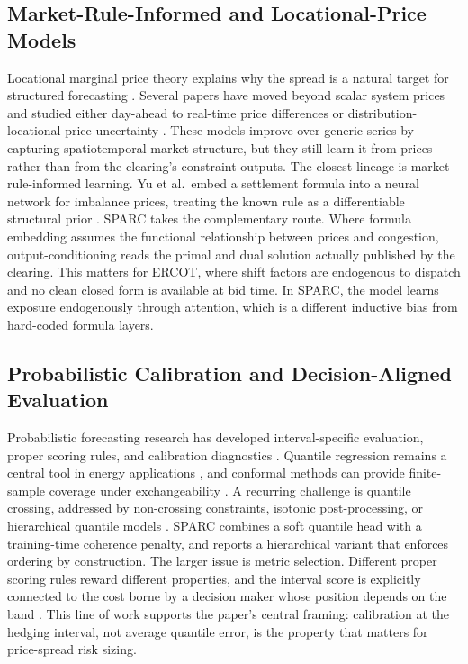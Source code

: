 \documentclass[twoside]{article}
\begin{document}
\subsection{Market-Rule-Informed and Locational-Price Models}
Locational marginal price theory explains why the spread is a natural target for structured forecasting \citep{hong2020locational}. Several papers have moved beyond scalar system prices and studied either day-ahead to real-time price differences or distribution-locational-price uncertainty \citep{das2021forecasting, toubeau2020capturing}. These models improve over generic series by capturing spatiotemporal market structure, but they still learn it from prices rather than from the clearing's constraint outputs. The closest lineage is market-rule-informed learning. Yu et al.\ embed a settlement formula into a neural network for imbalance prices, treating the known rule as a differentiable structural prior \citep{yu2026marketruleinformed}. SPARC takes the complementary route. Where formula embedding assumes the functional relationship between prices and congestion, output-conditioning reads the primal and dual solution actually published by the clearing. This matters for ERCOT, where shift factors are endogenous to dispatch and no clean closed form is available at bid time. In SPARC, the model learns exposure endogenously through attention, which is a different inductive bias from hard-coded formula layers.

\subsection{Probabilistic Calibration and Decision-Aligned Evaluation}
Probabilistic forecasting research has developed interval-specific evaluation, proper scoring rules, and calibration diagnostics \citep{gneiting2007strictly, bracher2021evaluating}. Quantile regression remains a central tool in energy applications \citep{taieb2016forecasting}, and conformal methods can provide finite-sample coverage under exchangeability \citep{vovk2005algorithmic, lei2018distribution}. A recurring challenge is quantile crossing, addressed by non-crossing constraints, isotonic post-processing, or hierarchical quantile models \citep{chen2025outlieradaptivebased, taieb2020hierarchical}. SPARC combines a soft quantile head with a training-time coherence penalty, and reports a hierarchical variant that enforces ordering by construction. The larger issue is metric selection. Different proper scoring rules reward different properties, and the interval score is explicitly connected to the cost borne by a decision maker whose position depends on the band \citep{bracher2021evaluating, hobbs2022probabilistic}. This line of work supports the paper's central framing: calibration at the hedging interval, not average quantile error, is the property that matters for price-spread risk sizing.
\end{document}

